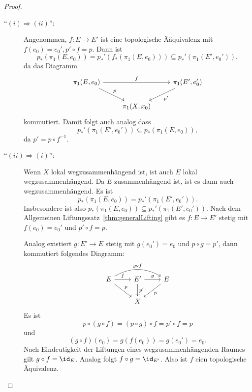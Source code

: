 \documentclass[language=ngerman]{TemplateLecture} %
\begin{document}
\begin{proof}
    \begin{description}
        \item[\enquote{$(i) \Rightarrow (ii)$}:] Angenommen, $f: E \to E'$ ist eine topologische Ääquivalenz mit $f(e_0) = e_0', p' \circ f = p$. Dann ist 
        \begin{equation*}
            p_*(\pi_1(E,e_0)) = p_*'(f_*(\pi_1(E, e_0))) \subseteq p_*'(\pi_1(E', e_0')),
        \end{equation*}
        da das Diagramm 
        \begin{equation*}
            \begin{tikzcd}
                \pi_1(E, e_0) \arrow[rr, "f"] \arrow[dr, "p"] & & \pi_1(E', e_0') \arrow[dl, "p'"] \\ & \pi_1(X, x_0)
            \end{tikzcd}
        \end{equation*}
        kommutiert. Damit folgt auch analog dass 
        \begin{equation*}
            p_*'(\pi_1(E', e_0')) \subseteq p_*(\pi_1(E, e_0)),
        \end{equation*}
        da $p' = p \circ f^{-1}$.
        \item[\enquote{$(ii) \Rightarrow (i)$}:] Wenn $X$ lokal wegzusammenhängend ist, ist auch $E$ lokal wegzusammenhängend. Da $E$ zusammenhängend ist, ist es dann auch wegzusammenhängend. Es ist 
        \begin{equation*}
            p_*(\pi_1(E, e_0)) = p_*'(\pi_1(E', e_0')).
        \end{equation*}
        Insbesondere ist also $p_*(\pi_1(E, e_0)) \subseteq p_*'(\pi_1(E', e_0'))$. Nach dem Allgemeinen Liftungssatz~\ref{thm:generalLifting} gibt es $f: E \to E'$ stetig mit $f(e_0) = e_0'$ und $p' \circ f = p$. 

        Analog existiert $g: E' \to E$ stetig mit $g(e_0') = e_0$ und $p \circ g = p'$, dann kommutiert folgendes Diagramm:
        \begin{equation*}
            \begin{tikzcd}
                E \arrow[r, "f"] \arrow[rr, bend left, "g \circ f"] \arrow [dr, "p"] & E' \arrow[r, "g"] \arrow[d, "p'"] & E \arrow[dl, "p"] \\ & X &
            \end{tikzcd}
        \end{equation*}
        Es ist 
        \begin{equation*}
            p \circ (g \circ f) = (p \circ g) \circ f = p' \circ f = p
        \end{equation*}
        und
        \begin{equation*}
            (g \circ f)(e_0) = g(f(e_0)) = g(e_0') = e_0.
        \end{equation*}
        Nach Eindeutigkeit der Liftungen eines wegzusammenhängenden Raumes gilt $g \circ f = \id_E$. Analog folgt $f \circ g = \id_{E'}$. Also ist $f$ eien topologische Äquivalenz.
    \end{description}
\end{proof}
\end{document}
